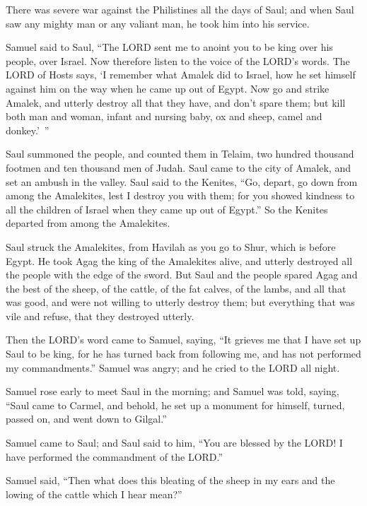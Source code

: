\myverse{}There was severe war against the Philistines all the days of
Saul; and when Saul saw any mighty man or any valiant man, he took him into his service.


\mychapter{} \myverse*{}Samuel said to Saul, “The LORD sent me to anoint you to be king
over his people, over Israel. Now therefore listen to the voice of the LORD’s words.
\myverse{}The LORD of Hosts says, ‘I remember what Amalek did to Israel, how he set himself
against him on the way when he came up out of Egypt.
\myverse{}Now go and strike Amalek, and utterly destroy all that they have, and don’t
spare them; but kill both man and woman, infant and nursing baby, ox and sheep, camel and donkey.’ ”

\myverse{}Saul summoned the people, and counted them in Telaim, two hundred
thousand footmen and ten thousand men of Judah.
\myverse{}Saul came to the city of Amalek, and set an ambush in the valley.
\myverse{}Saul said to the Kenites, “Go, depart, go down from among the Amalekites, lest
I destroy you with them; for you showed kindness to all the children of Israel when they came up out of
Egypt.” So the Kenites departed from among the Amalekites.

\myverse{}Saul struck the Amalekites, from Havilah as you go to Shur, which
is before Egypt.
\myverse{}He took Agag the king of the Amalekites alive, and utterly destroyed all the
people with the edge of the sword.
\myverse{}But Saul and the people spared Agag and the best of the sheep, of the cattle,
of the fat calves, of the lambs, and all that was good, and were not willing to utterly destroy them;
but everything that was vile and refuse, that they destroyed utterly.

\myverse{}Then the LORD’s word came to Samuel, saying,
\myverse{}“It grieves me that I have set up Saul to be king, for he has turned back
from following me, and has not performed my commandments.” Samuel was angry; and he cried to the LORD
all night.

\myverse{}Samuel rose early to meet Saul in the morning; and Samuel was
told, saying, “Saul came to Carmel, and behold, he set up a monument for himself, turned, passed on, and
went down to Gilgal.”

\myverse{}Samuel came to Saul; and Saul said to him, “You are blessed
by the LORD! I have performed the commandment of the LORD.”

\myverse{}Samuel said, “Then what does this bleating of the sheep in my
ears and the lowing of the cattle which I hear mean?”

